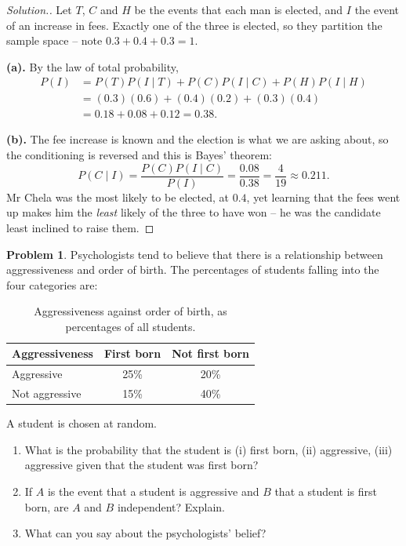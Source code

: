 \documentclass[12pt,a4paper]{report}
\theoremstyle{definition}
\theoremstyle{plain}
\theoremstyle{definition}
\newtheorem{problemx}{Problem}[section]
\newenvironment{problem}{\begin{problemx}}{\end{problemx}}
\newenvironment{solution}
  {\renewcommand{\qedsymbol}{}\begin{proof}[\textit{Solution}.]}
  {\end{proof}}
\begin{document}
\begin{solution}
Let $T$, $C$ and $H$ be the events that each man is elected, and $I$ the event of an
increase in fees. Exactly one of the three is elected, so they partition the sample space
-- note $0.3+0.4+0.3 = 1$.

\textbf{(a).} By the law of total probability,
\begin{align*}
P(I) &= P(T)P(I\mid T)+P(C)P(I\mid C)+P(H)P(I\mid H)\\
     &= (0.3)(0.6)+(0.4)(0.2)+(0.3)(0.4)\\
     &= 0.18+0.08+0.12 = 0.38.
\end{align*}

\textbf{(b).} The fee increase is known and the election is what we are asking about, so
the conditioning is reversed and this is Bayes' theorem:
\[P(C\mid I) = \frac{P(C)P(I\mid C)}{P(I)} = \frac{0.08}{0.38} = \frac{4}{19} \approx 0.211.\]
Mr Chela was the most likely to be elected, at $0.4$, yet learning that the fees went up
makes him the \emph{least} likely of the three to have won -- he was the candidate least
inclined to raise them.
\end{solution}

\begin{problem}
Psychologists tend to believe that there is a relationship between aggressiveness and
order of birth. The percentages of students falling into the four categories are:
\begin{table}[H]
\centering
\begin{tabular}{lcc}
Aggressiveness & First born & Not first born\\
\hline
Aggressive     & 25\% & 20\%\\
Not aggressive & 15\% & 40\%\\
\end{tabular}
\caption{Aggressiveness against order of birth, as percentages of all students.}
\end{table}
A student is chosen at random.
\begin{enumerate}
\item[(a).] What is the probability that the student is (i) first born, (ii) aggressive,
(iii) aggressive given that the student was first born?
\item[(b).] If $A$ is the event that a student is aggressive and $B$ that a student is
first born, are $A$ and $B$ independent? Explain.
\item[(c).] What can you say about the psychologists' belief?
\end{enumerate}
\end{problem}
\end{document}
